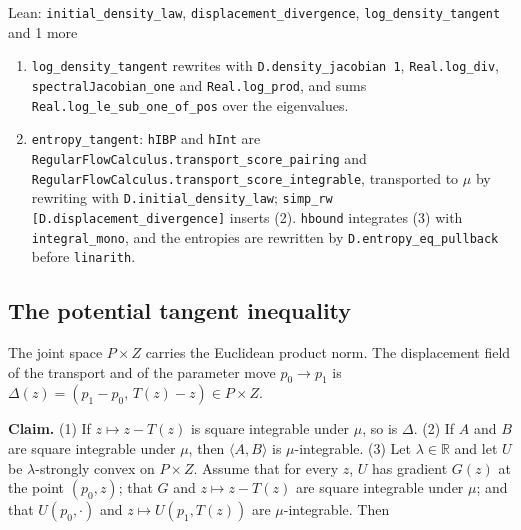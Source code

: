 \documentclass[11pt,a4paper]{report}
\begin{document}
\begin{leanbox}{Lean: \texttt{initial\_\allowbreak{}density\_\allowbreak{}law}, \texttt{displacement\_\allowbreak{}divergence}, \texttt{log\_\allowbreak{}density\_\allowbreak{}tangent} and 1 more}
\begin{enumerate}
\item \texttt{log\_\allowbreak{}density\_\allowbreak{}tangent} rewrites with \texttt{D.\allowbreak{}density\_\allowbreak{}jacobian 1}, \texttt{Real.\allowbreak{}log\_\allowbreak{}div}, \texttt{spectral\allowbreak{}Jacobian\_\allowbreak{}one} and \texttt{Real.\allowbreak{}log\_\allowbreak{}prod}, and sums \texttt{Real.\allowbreak{}log\_\allowbreak{}le\_\allowbreak{}sub\_\allowbreak{}one\_\allowbreak{}of\_\allowbreak{}pos} over the eigenvalues.

\item \texttt{entropy\_\allowbreak{}tangent}: \texttt{h\allowbreak{}IBP} and \texttt{h\allowbreak{}Int} are \texttt{Regular\allowbreak{}Flow\allowbreak{}Calculus.\allowbreak{}transport\_\allowbreak{}score\_\allowbreak{}pairing} and \texttt{Regular\allowbreak{}Flow\allowbreak{}Calculus.\allowbreak{}transport\_\allowbreak{}score\_\allowbreak{}integrable}, transported to \(\mu\) by rewriting with \texttt{D.\allowbreak{}initial\_\allowbreak{}density\_\allowbreak{}law}; \texttt{simp\_\allowbreak{}rw [D.\allowbreak{}displacement\_\allowbreak{}divergence]} inserts (2). \texttt{hbound} integrates (3) with \texttt{integral\_\allowbreak{}mono}, and the entropies are rewritten by \texttt{D.\allowbreak{}entropy\_\allowbreak{}eq\_\allowbreak{}pullback} before \texttt{linarith}.

\end{enumerate}
\end{leanbox}
\subsection{\texorpdfstring{The potential tangent inequality}{The potential tangent inequality}}


The joint space \(P\times Z\) carries the Euclidean product norm. The displacement field of the transport and of the parameter move \(p_0\to p_1\) is \(\Delta(z)=(p_1-p_0,\,T(z)-z)\in P\times Z\).




\textbf{Claim.} (1) If \(z\mapsto z-T(z)\) is square integrable under \(\mu\), so is \(\Delta\). (2) If \(A\) and \(B\) are square integrable under \(\mu\), then \(\langle A,B\rangle\) is \(\mu\)-integrable. (3) Let \(\lambda\in\mathbb R\) and let \(U\) be \(\lambda\)-strongly convex on \(P\times Z\). Assume that for every \(z\), \(U\) has gradient \(G(z)\) at the point \((p_0,z)\); that \(G\) and \(z\mapsto z-T(z)\) are square integrable under \(\mu\); and that \(U(p_0,\cdot)\) and \(z\mapsto U(p_1,T(z))\) are \(\mu\)-integrable. Then
\end{document}
